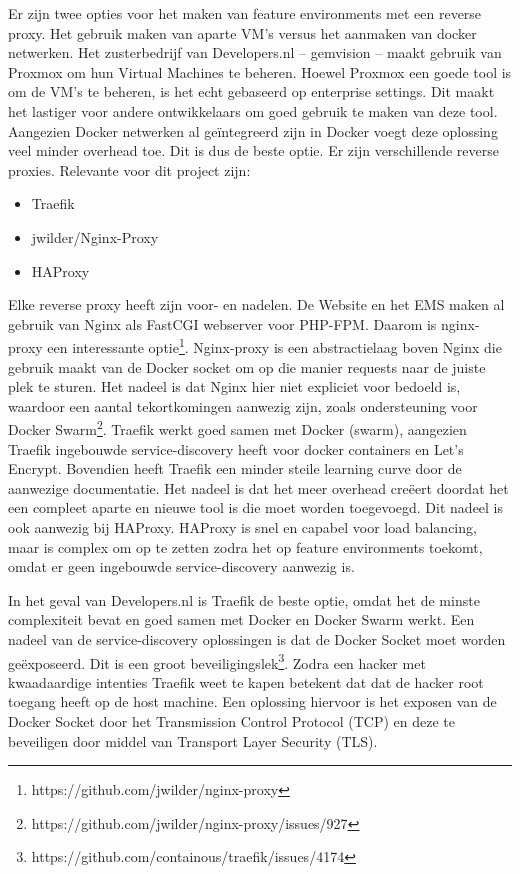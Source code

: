 Er zijn twee opties voor het maken van feature environments met een reverse proxy. Het gebruik maken van aparte VM's versus het aanmaken van docker netwerken. Het zusterbedrijf van Developers.nl -- gemvision -- maakt gebruik van Proxmox om hun Virtual Machines te beheren. Hoewel Proxmox een goede tool is om de VM's te beheren, is het echt gebaseerd op enterprise settings. Dit maakt het lastiger voor andere ontwikkelaars om goed gebruik te maken van deze tool. Aangezien Docker netwerken al geïntegreerd zijn in Docker voegt deze oplossing veel minder overhead toe. Dit is dus de beste optie. Er zijn verschillende reverse proxies. Relevante voor dit project zijn:
\begin{itemize}
	\item Traefik
	\item jwilder/Nginx-Proxy
	\item HAProxy	
\end{itemize}

Elke reverse proxy heeft zijn voor- en nadelen. De Website en het EMS maken al gebruik van Nginx als FastCGI webserver voor PHP-FPM. Daarom is nginx-proxy een interessante optie\footnote{https://github.com/jwilder/nginx-proxy}. Nginx-proxy is een abstractielaag boven Nginx die gebruik maakt van de Docker socket om op die manier requests naar de juiste plek te sturen. Het nadeel is dat Nginx hier niet expliciet voor bedoeld is, waardoor een aantal tekortkomingen aanwezig zijn, zoals ondersteuning voor Docker Swarm\footnote{https://github.com/jwilder/nginx-proxy/issues/927}. Traefik werkt goed samen met Docker (swarm), aangezien Traefik ingebouwde service-discovery heeft voor docker containers en Let's Encrypt. Bovendien heeft Traefik een minder steile learning curve door de aanwezige documentatie. Het nadeel is dat het meer overhead creëert doordat het een compleet aparte en nieuwe tool is die moet worden toegevoegd. Dit nadeel is ook aanwezig bij HAProxy. HAProxy is snel en capabel voor load balancing, maar is complex om op te zetten zodra het op feature environments toekomt, omdat er geen ingebouwde service-discovery aanwezig is. 

In het geval van Developers.nl is Traefik de beste optie, omdat het de minste complexiteit bevat en goed samen met Docker en Docker Swarm werkt. Een nadeel van de service-discovery oplossingen is dat de Docker Socket moet worden geëxposeerd. Dit is een groot beveiligingslek\footnote{https://github.com/containous/traefik/issues/4174}. Zodra een hacker met kwaadaardige intenties Traefik weet te kapen betekent dat dat de hacker root toegang heeft op de host machine. Een oplossing hiervoor is het exposen van de Docker Socket door het Transmission Control Protocol (TCP) en deze te beveiligen door middel van Transport Layer Security (TLS).

